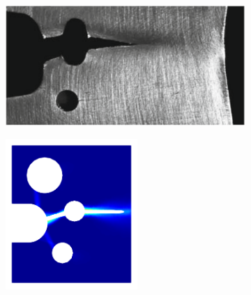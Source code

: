 \begin{frame}
\begin{columns}[T]
\begin{column}{0.6\textwidth}
\begin{figure}
\begin{subfigure}{0.95\linewidth}
        \end{subfigure}
        
        \begin{subfigure}{0.32\textwidth}
          \centering
          \includegraphics[width=\textwidth]{examples/figures/SFC_schematics}
        \end{subfigure}
        \begin{subfigure}{0.32\textwidth}
          \centering
          \includegraphics[width=0.55\textwidth]{examples/figures/W_pl_3}
        \end{subfigure}
        \begin{subfigure}{0.32\textwidth}
          \centering

\end{subfigure}
\end{figure}
\end{column}
\end{columns}
\end{frame}
